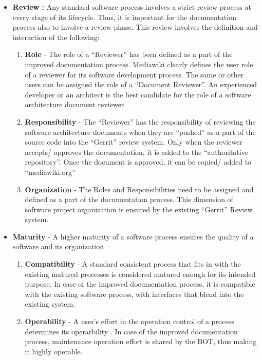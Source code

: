 \begin{itemize}
\item \textbf{Review : } Any standard software process involves a strict review process at every stage of its lifecycle. Thus, it is important for the documentation process also to involve a review phase. This review involves the definition and interaction of the following:
\begin{enumerate}
\item \textbf{Role} - The role of a \enquote{Reviewer} has been defined as a part of the improved documentation process. Mediawiki clearly defines the user role of a reviewer for its software development process. The same or other users can be assigned the role of a \enquote{Document Reviewer}. An experienced developer or an architect is the best candidate for the role of a software architecture document reviewer.
\item \textbf{Responsibility} - The \enquote{Reviewer} has the responsibility of reviewing the software architecture documents when they are \enquote{pushed} as a part of the source code into the \enquote{Gerrit} review system. Only when the reviewer accepts/ approves the documentation, it is added to the \enquote{authoritative repository}. Once the document is approved, it can be copied/ added to \enquote{mediawiki.org}
\item \textbf{Organization} - The Roles and Responsibilities need to be assigned and defined as a part of the documentation process. This dimension of software project organization is ensured by the existing \enquote{Gerrit} Review system.
\end{enumerate}
\item \textbf{Maturity} - A higher maturity of a software process ensures the quality of a software and its organization
\begin{enumerate}
\item \textbf{Compatibility} - A standard consistent process that fits in with the existing matured processes is considered matured enough for its intended purpose. In case of the improved documentation process, it is compatible with the existing software process, with interfaces that blend into the existing system.
\item \textbf{Operability} - A user's effort in the operation control of a process determines its operarbility \cite{Berander2005}. In case of the improved documentation process, maintenance operation effort is shared by the BOT, thus making it highly operable.
\end{enumerate}

\end{itemize}
